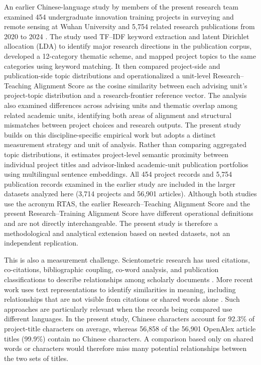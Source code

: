 \documentclass[pdflatex,sn-apa]{sn-jnl}
\begin{document}
An earlier Chinese-language study by members of the present research team examined 454 undergraduate innovation training projects in surveying and remote sensing at Wuhan University and 5,754 related research publications from 2020 to 2024 \citep{tian2026surveying}. The study used TF--IDF keyword extraction and latent Dirichlet allocation (LDA) to identify major research directions in the publication corpus, developed a 12-category thematic scheme, and mapped project topics to the same categories using keyword matching. It then compared project-side and publication-side topic distributions and operationalized a unit-level Research--Teaching Alignment Score as the cosine similarity between each advising unit's project-topic distribution and a research-frontier reference vector. The analysis also examined differences across advising units and thematic overlap among related academic units, identifying both areas of alignment and structural mismatches between project choices and research outputs. The present study builds on this discipline-specific empirical work but adopts a distinct measurement strategy and unit of analysis. Rather than comparing aggregated topic distributions, it estimates project-level semantic proximity between individual project titles and advisor-linked academic-unit publication portfolios using multilingual sentence embeddings. All 454 project records and 5,754 publication records examined in the earlier study are included in the larger datasets analyzed here (3,714 projects and 56,901 articles). Although both studies use the acronym RTAS, the earlier Research--Teaching Alignment Score and the present Research--Training Alignment Score have different operational definitions and are not directly interchangeable. The present study is therefore a methodological and analytical extension based on nested datasets, not an independent replication.

This is also a measurement challenge. Scientometric research has used citations, co-citations, bibliographic coupling, co-word analysis, and publication classifications to describe relationships among scholarly documents \citep{small1973cocitation,callon1991coword,boyack2010cocitation,yanding2012networks,waltman2012classification}. More recent work uses text representations to identify similarities in meaning, including relationships that are not visible from citations or shared words alone \citep{lamers2021appraisal,huang2022interdisciplinarity,motohashi2024measuring}. Such approaches are particularly relevant when the records being compared use different languages. In the present study, Chinese characters account for 92.3\% of project-title characters on average, whereas 56,858 of the 56,901 OpenAlex article titles (99.9\%) contain no Chinese characters. A comparison based only on shared words or characters would therefore miss many potential relationships between the two sets of titles.
\end{document}
